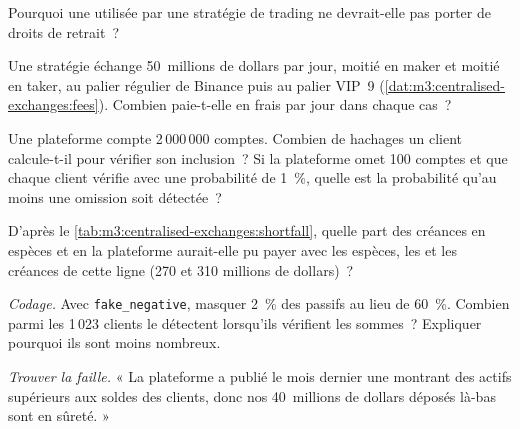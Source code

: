 \begin{exercise}[$\star$]\label{exo:m3:centralised-exchanges:3}
Pourquoi une  utilisée par une stratégie de trading ne devrait-elle pas porter de droits de retrait~?
\end{exercise}

\begin{exercise}[$\star\star$]\label{exo:m3:centralised-exchanges:4}
Une stratégie échange 50~millions de dollars par jour, moitié en maker et moitié en taker, au palier régulier de Binance puis
au palier VIP~9 (\cref{dat:m3:centralised-exchanges:fees}). Combien paie-t-elle en frais par jour dans chaque cas~?
\end{exercise}

\begin{exercise}[$\star\star$]\label{exo:m3:centralised-exchanges:5}
Une plateforme compte 2\,000\,000 comptes. Combien de hachages un client calcule-t-il pour vérifier son inclusion~? Si
la plateforme omet 100 comptes et que chaque client vérifie avec une probabilité de 1~\%, quelle est la probabilité
qu'au moins une omission soit détectée~?
\end{exercise}

\begin{exercise}[$\star\star$]\label{exo:m3:centralised-exchanges:6}
D'après le \cref{tab:m3:centralised-exchanges:shortfall}, quelle part des créances en espèces et en  la plateforme aurait-elle pu payer
avec les espèces, les  et les créances de cette ligne (270 et 310 millions de dollars)~?
\end{exercise}

\begin{exercise}[$\star\star\star$]\label{exo:m3:centralised-exchanges:7}
\emph{Codage.} Avec \texttt{fake\_negative}, masquer 2~\% des passifs au lieu de 60~\%. Combien parmi les
1\,023 clients le détectent lorsqu'ils vérifient les sommes~? Expliquer pourquoi ils sont moins nombreux.
\end{exercise}

\begin{exercise}[$\star\star\star$]\label{exo:m3:centralised-exchanges:8}
\emph{Trouver la faille.} « La plateforme a publié le mois dernier une  montrant des actifs supérieurs aux soldes des clients,
donc nos 40~millions de dollars déposés là-bas sont en sûreté. »
\end{exercise}

